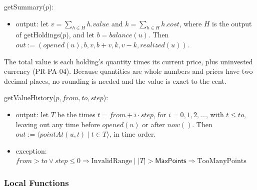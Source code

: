 \documentclass[12pt, titlepage]{article}
\begin{document}
\noindent getSummary($p$):
\begin{itemize}
\item output: let $v = \sum_{h \in H} h.\mathit{value}$ and $k = \sum_{h \in
  H} h.\mathit{cost}$, where $H$ is the output of getHoldings($p$), and let
  $b = \mathit{balance}(u)$. Then $\mathit{out} := (\mathit{opened}(u), b, v,
  b + v, k, v - k, \mathit{realized}(u))$.
\end{itemize}

\noindent The total value is each holding's quantity times its current
price, plus uninvested currency (PR-PA-04). Because quantities are whole
numbers and prices have two decimal places, no rounding is needed and the
value is exact to the cent.

\medskip

\noindent getValueHistory($p, \mathit{from}, \mathit{to}, \mathit{step}$):
\begin{itemize}
\item output: let $T$ be the times $t = \mathit{from} + i \cdot
  \mathit{step}$, for $i = 0, 1, 2, \ldots$, with $t \leq \mathit{to}$,
  leaving out any time before $\mathit{opened}(u)$ or after
  $\mathit{now}()$. Then $\mathit{out} := \langle \mathit{pointAt}(u, t)
  \mid t \in T \rangle$, in time order.
\item exception: $\mathit{from} > \mathit{to} \vee \mathit{step} \leq 0
  \Rightarrow \mathrm{InvalidRange} \mid |T| > \textsf{MaxPoints}
  \Rightarrow \mathrm{TooManyPoints}$
\end{itemize}

\subsubsection{Local Functions}
\end{document}
